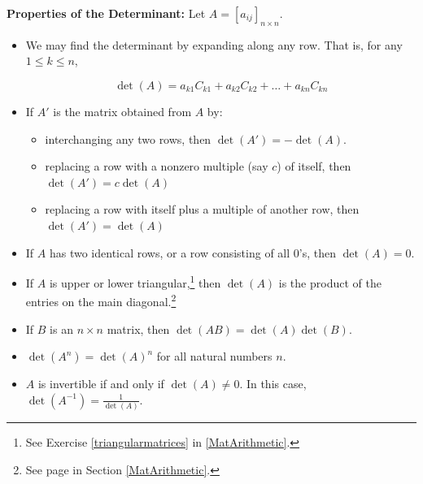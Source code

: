 \documentclass{ximera}
\begin{document}
\begin{theorem} \label{determinantprops}  \textbf{Properties of the Determinant:} Let $A = \left[a_{ij}\right]_{n \times n}$.  

\begin{itemize}

\item  We may find the determinant by expanding along any row.  That is, for any $1 \leq k \leq n$, 

\[\det(A) = a_{k1}C_{k1} +  a_{k2}C_{k2} + \ldots + a_{kn} C_{kn}\]

\item  If $A'$ is the matrix obtained from $A$ by:

\begin{itemize}

\item interchanging any two rows, then $\det(A')=-\det(A)$.

\item  replacing a row with a nonzero multiple (say $c$) of itself, then $\det(A')=c\det(A)$

\item  replacing a row with itself plus a multiple of another row, then $\det(A')=\det(A)$

\end{itemize}

\item  If $A$ has two identical rows, or a row consisting of all $0$'s, then $\det(A) = 0$.

\item  If $A$ is upper or lower triangular,\footnote{See Exercise \ref{triangularmatrices} in \ref{MatArithmetic}.} then $\det(A)$ is the product of the entries on the main diagonal.\footnote{See page \pageref{maindiagonal} in Section \ref{MatArithmetic}.}

\item  If $B$ is an $n \times n$ matrix, then $\det(AB) = \det(A) \det(B)$.

\item  $\det\left(A^{n}\right) = \det(A)^{n}$ for all natural numbers $n$.

\item  $A$ is invertible if and only if $\det(A) \neq 0$.  In this case, $\det\left(A^{-1}\right) = \frac{1}{\det(A)}$.

\end{itemize}

\end{theorem}
\end{document}
